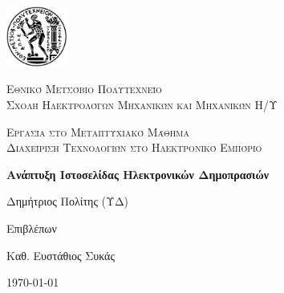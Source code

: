 \documentclass[12pt]{report}
\newcommand\blankpage{%
    \null
    \thispagestyle{empty}%
    \addtocounter{page}{-1}%
    \newpage}
\begin{document}

\hypersetup{pageanchor=false}

\begin{titlepage}
  \centering
  \includegraphics[width=0.15\textwidth]{pyrforos}\par\vspace{1cm}
  {\scshape\LARGE Εθνικό Μετσόβιο Πολυτεχνείο\\
  Σχολή Ηλεκτρολόγων Μηχανικών και Μηχανικών Η/Υ\par}
  \vspace{1cm}
  {\scshape\Large Εργασία στο Μεταπτυχιακό Μάθημα\\
  Διαχείριση Τεχνολογιών στο Ηλεκτρονικό Εμπόριο\par}
  \vspace{1.5cm}
  {\Large\bfseries Ανάπτυξη Ιστοσελίδας Ηλεκτρονικών Δημοπρασιών\par}
  \vspace{2cm}
  {\large Δημήτριος Πολίτης (ΥΔ)\par}
  \vfill
  Επιβλέπων \par
  Καθ. Ευστάθιος Συκάς

  \vfill

  {\large \today\par}
  \afterpage{\blankpage}
\end{titlepage}

\tableofcontents
\thispagestyle{empty}

\listoffigures
\thispagestyle{empty}

\begin{abstract}
Στο παρόν παρουσιάζεται η λειτουργία και η διαδικασία ανάπτυξης μιας ιστοσελίδας δημοπρασιών. Αρχικά  γίνεται αναφορά στις βασικές έννοιες του ηλεκτρονικού εμπορίου και στη συνέχεια περιγράφεται αναλυτικά η διαδικασία δημιουργίας ενός ιστοτόπου ηλεκτρονικών δημοπρασιών με τη χρήση αυτοματοποιημένων εργαλείων (\textlatin{phpProBid, vagrant}). Η εργασία είναι διαθέσιμη από το σύνδεσμο \textlatin{\url{https://github.com/dpolitis/e-commerce}}.

\vspace{10mm}

\noindent \textbf{Λέξεις κλειδιά:} Ηλεκτρονικό Εμπόριο, Ηλεκτρονική Δημοπρασία, Ανοιχτός Κώδικας, Εξυπηρετητής Ιστοσελίδων, Διαδίκτυο.
\end{abstract}
\end{document}
